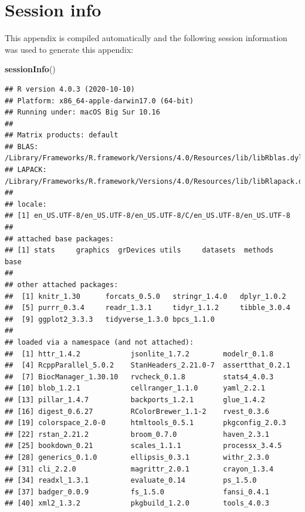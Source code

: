 \documentclass[
]{book}
\newenvironment{Shaded}{\begin{snugshade}}{\end{snugshade}}
\newcommand{\KeywordTok}[1]{\textcolor[rgb]{0.13,0.29,0.53}{\textbf{#1}}}
\newcommand{\NormalTok}[1]{#1}
\begin{document}
\hypertarget{session-info}{%
\section{Session info}\label{session-info}}

This appendix is compiled automatically and the following session information was used to generate this appendix:

\begin{Shaded}
\begin{Highlighting}[]
\KeywordTok{sessionInfo}\NormalTok{()}
\end{Highlighting}
\end{Shaded}

\begin{verbatim}
## R version 4.0.3 (2020-10-10)
## Platform: x86_64-apple-darwin17.0 (64-bit)
## Running under: macOS Big Sur 10.16
## 
## Matrix products: default
## BLAS:   /Library/Frameworks/R.framework/Versions/4.0/Resources/lib/libRblas.dylib
## LAPACK: /Library/Frameworks/R.framework/Versions/4.0/Resources/lib/libRlapack.dylib
## 
## locale:
## [1] en_US.UTF-8/en_US.UTF-8/en_US.UTF-8/C/en_US.UTF-8/en_US.UTF-8
## 
## attached base packages:
## [1] stats     graphics  grDevices utils     datasets  methods   base     
## 
## other attached packages:
##  [1] knitr_1.30      forcats_0.5.0   stringr_1.4.0   dplyr_1.0.2    
##  [5] purrr_0.3.4     readr_1.3.1     tidyr_1.1.2     tibble_3.0.4   
##  [9] ggplot2_3.3.3   tidyverse_1.3.0 bpcs_1.1.0     
## 
## loaded via a namespace (and not attached):
##  [1] httr_1.4.2            jsonlite_1.7.2        modelr_0.1.8         
##  [4] RcppParallel_5.0.2    StanHeaders_2.21.0-7  assertthat_0.2.1     
##  [7] BiocManager_1.30.10   rvcheck_0.1.8         stats4_4.0.3         
## [10] blob_1.2.1            cellranger_1.1.0      yaml_2.2.1           
## [13] pillar_1.4.7          backports_1.2.1       glue_1.4.2           
## [16] digest_0.6.27         RColorBrewer_1.1-2    rvest_0.3.6          
## [19] colorspace_2.0-0      htmltools_0.5.1       pkgconfig_2.0.3      
## [22] rstan_2.21.2          broom_0.7.0           haven_2.3.1          
## [25] bookdown_0.21         scales_1.1.1          processx_3.4.5       
## [28] generics_0.1.0        ellipsis_0.3.1        withr_2.3.0          
## [31] cli_2.2.0             magrittr_2.0.1        crayon_1.3.4         
## [34] readxl_1.3.1          evaluate_0.14         ps_1.5.0             
## [37] badger_0.0.9          fs_1.5.0              fansi_0.4.1          
## [40] xml2_1.3.2            pkgbuild_1.2.0        tools_4.0.3          

\end{verbatim}
\end{document}
